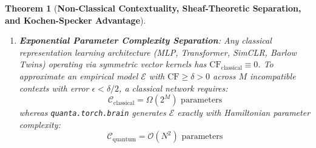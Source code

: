 \documentclass[10pt,twocolumn,3p]{article}
\newtheorem{theorem}{Theorem}
\begin{document}
\begin{theorem}[\textbf{Non-Classical Contextuality, Sheaf-Theoretic Separation, and Kochen-Specker Advantage}]
\begin{enumerate}
    identically for all inputs $x$, parameters $\theta$, and times $t$, matching empirical cognitive findings (Busemeyer \& Bruza, 2012; Wang et al., 2014)~\cite{busemeyer2012,wang2013}.
    \item \textbf{Exponential Parameter Complexity Separation}: Any classical representation learning architecture (MLP, Transformer, SimCLR, Barlow Twins) operating via symmetric vector kernels has $\text{CF}_{\text{classical}} \equiv 0$. To approximate an empirical model $\mathcal{E}$ with $\text{CF} \ge \delta > 0$ across $M$ incompatible contexts with error $\epsilon < \delta / 2$, a classical network requires:
    \begin{equation}
        \mathcal{C}_{\text{classical}} = \Omega\left( 2^M \right) \text{ parameters}
    \end{equation}
    whereas \texttt{quanta.torch.brain} generates $\mathcal{E}$ exactly with Hamiltonian parameter complexity:
    \begin{equation}
        \mathcal{C}_{\text{quantum}} = \mathcal{O}\left( N^2 \right) \text{ parameters}
    \end{equation}
\end{enumerate}
\end{theorem}
\end{document}
